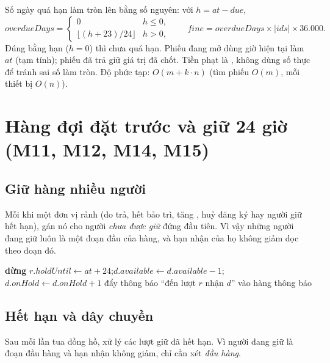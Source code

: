 Số ngày quá hạn làm tròn lên bằng số nguyên: với $h = at - due$,
\[
  overdueDays =
  \begin{cases}
    0 & h \le 0,\\
    \lfloor (h + 23)/24 \rfloor & h > 0,
  \end{cases}
  \qquad
  fine = overdueDays \times |ids| \times 36.000.
\]
Đúng bằng hạn ($h=0$) thì chưa quá hạn. Phiếu đang mở dùng giờ hiện tại làm $at$ (tạm tính); phiếu đã trả giữ giá trị đã chốt. Tiền phạt là , không dùng số thực để tránh sai số làm tròn. Độ phức tạp: $O(m + k\cdot n)$ (tìm phiếu $O(m)$, mỗi thiết bị $O(n)$).

\section{Hàng đợi đặt trước và giữ 24 giờ (M11, M12, M14, M15)}
\subsection{Giữ hàng nhiều người}
Mỗi khi một đơn vị rảnh (do trả, hết bảo trì, tăng , huỷ đăng ký hay người giữ hết hạn),  gán nó cho người \emph{chưa được giữ} đứng đầu tiên. Vì vậy những người đang giữ luôn là một đoạn đầu của hàng, và hạn nhận của họ không giảm dọc theo đoạn đó.

\begin{algorithm}[H]
\caption{\textsc{ServeQueue}$(d, at)$: $at$ là thời điểm đơn vị rảnh}
\begin{algorithmic}[1]
   \textbf{dừng} \EndIf
    \State $r.holdUntil \gets at + 24$;\quad $d.available \gets d.available-1$;\quad $d.onHold \gets d.onHold+1$
    \State đẩy thông báo ``đến lượt $r$ nhận $d$'' vào hàng thông báo
  \EndIf
\EndFor
\end{algorithmic}
\end{algorithm}

\subsection{Hết hạn và dây chuyền}
Sau mỗi lần tua đồng hồ,  xử lý các lượt giữ đã hết hạn. Vì người đang giữ là đoạn đầu hàng và hạn nhận không giảm, chỉ cần xét \emph{đầu hàng}.

